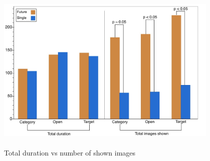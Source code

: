 \documentclass[english]{tktltiki}
\begin{document}
\begin{figure}[h!]
  \centering
    \includegraphics[width=0.95\textwidth,height=8cm]{figures/Bar_Chart__Duration_vs_Images.jpg}
    \caption{Total duration vs number of shown images}
    
    \label{dur_vs_img}
\end{figure}
\end{document}

